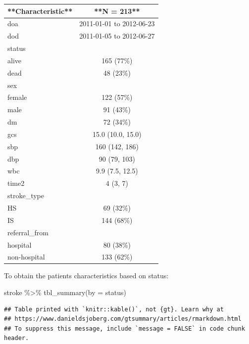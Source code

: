 \documentclass[
  10pt,
]{krantz}
\newenvironment{Shaded}{\begin{snugshade}}{\end{snugshade}}
\newcommand{\AttributeTok}[1]{\textcolor[rgb]{0.77,0.63,0.00}{#1}}
\newcommand{\FunctionTok}[1]{\textcolor[rgb]{0.00,0.00,0.00}{#1}}
\newcommand{\NormalTok}[1]{#1}
\newcommand{\SpecialCharTok}[1]{\textcolor[rgb]{0.00,0.00,0.00}{#1}}
\begin{document}
\begin{tabular}{l|c}
\hline
**Characteristic** & **N = 213**\\
\hline
doa & 2011-01-01 to 2012-06-23\\
\hline
dod & 2011-01-05 to 2012-06-27\\
\hline
status & \\
\hline
alive & 165 (77\%)\\
\hline
dead & 48 (23\%)\\
\hline
sex & \\
\hline
female & 122 (57\%)\\
\hline
male & 91 (43\%)\\
\hline
dm & 72 (34\%)\\
\hline
gcs & 15.0 (10.0, 15.0)\\
\hline
sbp & 160 (142, 186)\\
\hline
dbp & 90 (79, 103)\\
\hline
wbc & 9.9 (7.5, 12.5)\\
\hline
time2 & 4 (3, 7)\\
\hline
stroke\_type & \\
\hline
HS & 69 (32\%)\\
\hline
IS & 144 (68\%)\\
\hline
referral\_from & \\
\hline
hospital & 80 (38\%)\\
\hline
non-hospital & 133 (62\%)\\
\hline
\end{tabular}

To obtain the patients characteristics based on status:

\begin{Shaded}
\begin{Highlighting}[]
\NormalTok{stroke }\SpecialCharTok{\%\textgreater{}\%} 
  \FunctionTok{tbl\_summary}\NormalTok{(}\AttributeTok{by =}\NormalTok{ status)}
\end{Highlighting}
\end{Shaded}

\begin{verbatim}
## Table printed with `knitr::kable()`, not {gt}. Learn why at
## https://www.danieldsjoberg.com/gtsummary/articles/rmarkdown.html
## To suppress this message, include `message = FALSE` in code chunk header.
\end{verbatim}
\end{document}
